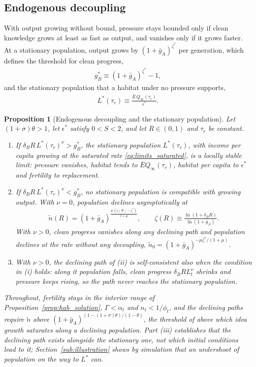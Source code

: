 \documentclass[11pt]{article}
\newtheorem{proposition}{Proposition}
\begin{document}
\subsection{Endogenous decoupling}
\label{sub:decoupling}
With output growing without bound, pressure stays bounded only if clean knowledge grows at least as fast
as output, and vanishes only if it grows faster. At a stationary population, output grows by $(1+\bar g_A)^{\zeta^\ast}$ per generation, which
defines the threshold for clean progress,
\begin{align}
g_B^\ast\equiv(1+\bar g_A)^{\zeta^\ast}-1,
\label{eq:gB_star}
\end{align}
and the stationary population that a habitat under no pressure supports,
\begin{align}
L^\ast(\tau_r)\equiv\frac{\bar E\,Q_\infty(\tau_r)}{\epsilon^\ast}.
\label{eq:L_star}
\end{align}

\begin{proposition}[Endogenous decoupling and the stationary population]
\label{prop:threshold}
\label{prop:decoupling}
Let $(1+\sigma)\theta>1$, let $\epsilon^\ast$ satisfy $0<S<2$, and let $R\in(0,1)$ and $\tau_r$ be constant.
\begin{enumerate}
\item[(i)] If $\delta_BR\,L^\ast(\tau_r)^{\nu}>g_B^\ast$, the stationary population $L^\ast(\tau_r)$, with
income per capita growing at the saturated rate \eqref{eq:limits_saturated}, is a locally stable limit:
pressure vanishes, habitat tends to $\bar EQ_\infty(\tau_r)$, habitat per capita to $\epsilon^\ast$ and
fertility to replacement.
\item[(ii)] If $\delta_BR\,L^\ast(\tau_r)^{\nu}<g_B^\ast$, no stationary population is compatible with
growing output. With $\nu=0$, population declines asymptotically at
\begin{align}
\tilde n(R)=(1+\bar g_A)^{\frac{\mu\,(\zeta(R)-\zeta^\ast)}{1+\mu}},
\qquad
\zeta(R)\equiv\frac{\ln(1+\delta_BR)}{\ln(1+\bar g_A)}.
\label{eq:n_tilde}
\end{align}
With $\nu>0$, clean progress vanishes along any declining path and population declines at the rate
without any decoupling, $\tilde n_0=(1+\bar g_A)^{-\mu\zeta^\ast/(1+\mu)}$.
\item[(iii)] With $\nu>0$, the declining path of (ii) is self-consistent also when the condition in (i)
holds: along it population falls, clean progress $\delta_BRL_t^{\nu}$ shrinks and pressure keeps rising,
so the path never reaches the stationary population.
\end{enumerate}
Throughout, fertility stays in the interior range of Proposition~\ref{prop:hab_solution},
$\Gamma<\alpha_t$ and $n_t<1/\phi_t$, and the declining paths require $\tilde n$ above
$(1+\bar g_A)^{(1-(1+\sigma)\theta)/(1-\theta)}$, the threshold of
\citet[Proposition~3]{STRULIK2024104943} above which idea growth saturates along a declining population.
Part (iii) establishes that the declining path exists alongside the stationary one, not which initial
conditions lead to it; Section~\ref{sub:illustration} shows by simulation that an undershoot of
population on the way to $L^\ast$ can.
\end{proposition}
\end{document}
